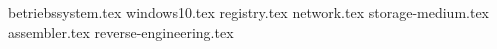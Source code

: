 {betriebssystem.tex}
{windows10.tex}
{registry.tex}
{network.tex}
{storage-medium.tex}
{assembler.tex}
{reverse-engineering.tex}